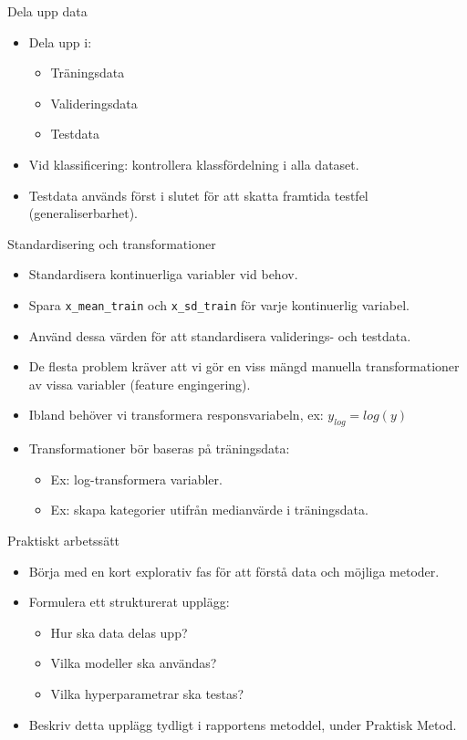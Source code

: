 \documentclass[10pt,english]{beamer}
\begin{document}
\begin{frame}{Dela upp data}
\begin{itemize}
    \item Dela upp i:
    \begin{itemize}
        \item Träningsdata
        \item Valideringsdata
        \item Testdata
    \end{itemize}
    \item Vid klassificering: kontrollera klassfördelning i alla dataset.
    \item Testdata används först i slutet för att skatta framtida testfel (generaliserbarhet).
\end{itemize}
\end{frame}

\begin{frame}{Standardisering och transformationer}
\begin{itemize}
    \item Standardisera kontinuerliga variabler vid behov.
    \item Spara \texttt{x\_mean\_train} och \texttt{x\_sd\_train} för varje kontinuerlig variabel.
    \item Använd dessa värden för att standardisera validerings- och testdata.
    \item De flesta problem kräver att vi gör en viss mängd manuella 
    transformationer av vissa variabler (feature engingering).
    \item Ibland behöver vi transformera responsvariabeln, ex: $y_{log} = log(y)$
    \item Transformationer bör baseras på träningsdata:
    \begin{itemize}
        \item Ex: log-transformera variabler.
        \item Ex: skapa kategorier utifrån medianvärde i träningsdata.
    \end{itemize}
\end{itemize}
\end{frame}

\begin{frame}{Praktiskt arbetssätt}
\begin{itemize}
    \item Börja med en kort explorativ fas för att förstå data och möjliga metoder.
    \item Formulera ett strukturerat upplägg:
    \begin{itemize}
        \item Hur ska data delas upp?
        \item Vilka modeller ska användas?
        \item Vilka hyperparametrar ska testas?
    \end{itemize}
    \item Beskriv detta upplägg tydligt i rapportens metoddel, under Praktisk Metod.
\end{itemize}
\end{frame}
\end{document}
